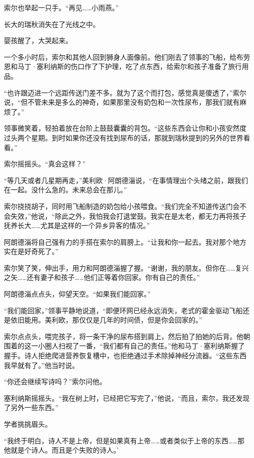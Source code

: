 \documentclass[AutoFakeBold=true]{book}
\begin{document}
索尔也举起一只手。``再见……小雨燕。''

长大的瑞秋消失在了光线之中。

婴孩醒了，大哭起来。

\vspace*{1em}

一个多小时后，索尔和其他人回到狮身人面像前。他们刚去了领事的飞船，给布劳恩和马丁·塞利纳斯的伤口作了下护理，吃了点东西，给索尔和孩子准备了旅行用品。

``也许跟迈进一个远距传送门差不多。就为了这个而打包，感觉真是傻透了，''索尔说，``但不管未来是多么的神奇，如果那里没有奶包和一次性尿布，那我们就有麻烦了。''

领事微笑着，轻拍着放在台阶上鼓鼓囊囊的背包。``这些东西会让你和小孩安然度过头两个星期。到时如果你还没有找到尿布的话，那就到瑞秋提到的另外的世界看看。''

索尔摇摇头。``真会这样？''

``等几天或者几星期再走，''美利欧·阿朗德淄说，``在事情理出个头绪之前，跟我们在一起。没什么急的。未来总会在那儿。''

索尔挠挠胡子，同时用飞船制造的奶包给小孩喂食。``我们完全不知道传送门会不会失效，''他说，``除此之外，我怕我会打退堂鼓。我实在是太老，都无力再将孩子抚养长大……尤其是这样的一个异乡异客的情况。''

阿朗德淄将自己强有力的手搭在索尔的肩膀上。``让我和你一起去。我对那个地方实在是好奇死了。''

索尔笑了笑，伸出手，用力和阿朗德淄握了握。``谢谢，我的朋友。但你在……复兴之矢……还有妻子和孩子……他们正等着你回家。你有自己的责任。''

阿朗德淄点点头，仰望天空。``如果我们能回家。''

``我们能回家，''领事平静地说道，``即便环网已经永远消失，老式的霍金驱动飞船还是依旧能用。美利欧，那仅仅是几年的时间债，但是你会回家的。''

索尔点点头，喂完孩子，将一条干净的尿布搭到肩上，然后拍了拍她的后背。他朝围着的这一小圈人扫视了一番，``我们都有自己的责任。''他和马丁·塞利纳斯握了握手。诗人拒绝爬进营养恢复槽中，也拒绝通过手术除掉神经分流器。``这些东西我早就有了。''他当时说。

``你还会继续写诗吗？''索尔问他。

塞利纳斯摇摇头。``我在树上时，已经把它写完了，''他说，``而且，索尔，我还发现了另外一些东西。''

学者挑挑眉头。

``我终于明白，诗人不是上帝，但是如果真有上帝……或者类似于上帝的东西……那他就是个诗人。而且是个失败的诗人。'
\end{document}
